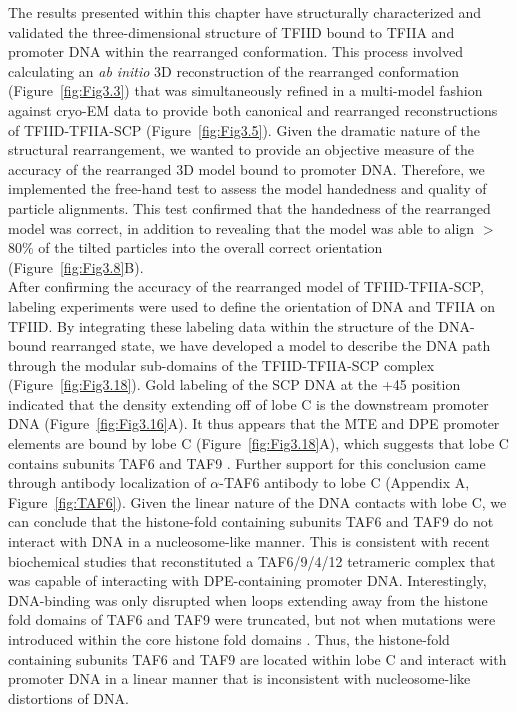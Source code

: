 The results presented within this chapter have structurally characterized and validated the three-dimensional structure of TFIID bound to TFIIA and promoter DNA within the rearranged conformation. This process involved calculating an \emph{ab initio} 3D reconstruction of the rearranged conformation (Figure~\ref{fig:Fig3.3}) that was simultaneously refined in a multi-model fashion against cryo-EM data to provide both canonical and rearranged reconstructions of TFIID-TFIIA-SCP (Figure~\ref{fig:Fig3.5}). Given the dramatic nature of the structural rearrangement, we wanted to provide an objective measure of the accuracy of the rearranged 3D model bound to promoter DNA. Therefore, we implemented the free-hand test to assess the model handedness and quality of particle alignments. This test confirmed that the handedness of the rearranged model was correct, in addition to revealing that the model was able to align $>$ 80\% of the tilted particles into the overall correct orientation (Figure~\ref{fig:Fig3.8}B).  \\
\indent After confirming the accuracy of the rearranged model of TFIID-TFIIA-SCP, labeling experiments were used to define the orientation of DNA and TFIIA on TFIID. By integrating these labeling data within the structure of the DNA-bound rearranged state, we have developed a model to describe the DNA path through the modular sub-domains of the TFIID-TFIIA-SCP complex (Figure~\ref{fig:Fig3.18}). Gold labeling of the SCP DNA at the +45 position indicated that the density extending off of lobe C is the downstream promoter DNA (Figure~\ref{fig:Fig3.16}A). It thus appears that the MTE and DPE promoter elements are bound by lobe C (Figure~\ref{fig:Fig3.18}A), which suggests that lobe C contains subunits TAF6 and TAF9 \cite{Burke_2739, Theisen_341}. Further support for this conclusion came through antibody localization of $\alpha$-TAF6 antibody to lobe C (Appendix A, Figure~\ref{fig:TAF6}). Given the linear nature of the DNA contacts with lobe C, we can conclude that the histone-fold containing subunits TAF6 and TAF9 do not interact with DNA in a nucleosome-like manner. This is consistent with recent biochemical studies that reconstituted a TAF6/9/4/12 tetrameric complex that was capable of interacting with DPE-containing promoter DNA. Interestingly, DNA-binding was only disrupted when loops extending away from the histone fold domains of TAF6 and TAF9 were truncated, but not when mutations were introduced within the core histone fold domains  \cite{Shao_1340}. Thus, the histone-fold containing subunits TAF6 and TAF9 are located within lobe C and interact with promoter DNA in a linear manner that is inconsistent with nucleosome-like distortions of DNA. \\ 
